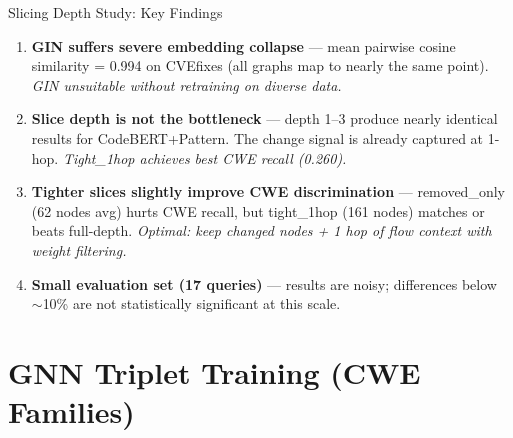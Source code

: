 \documentclass[aspectratio=169,10pt]{beamer}
\begin{document}
\begin{frame}{Slicing Depth Study: Key Findings}
  \begin{enumerate}
    \item[\textcolor{c1}{\faIcon{compress-arrows-alt}}]
      \textbf{GIN suffers severe embedding collapse} — mean pairwise cosine similarity = 0.994
      on CVEfixes (all graphs map to nearly the same point).
      \textit{GIN unsuitable without retraining on diverse data.}

    \vspace{0.3em}
    \item[\textcolor{hit}{\faIcon{chart-bar}}]
      \textbf{Slice depth is not the bottleneck} — depth 1–3 produce nearly identical results
      for CodeBERT+Pattern. The change signal is already captured at 1-hop.
      \textit{Tight\_1hop achieves best CWE recall (0.260).}

    \vspace{0.3em}
    \item[\textcolor{warn}{\faIcon{lightbulb}}]
      \textbf{Tighter slices slightly improve CWE discrimination} — removed\_only (62 nodes avg)
      hurts CWE recall, but tight\_1hop (161 nodes) matches or beats full-depth.
      \textit{Optimal: keep changed nodes + 1 hop of flow context with weight filtering.}

    \vspace{0.3em}
    \item[\textcolor{c3}{\faIcon{bug}}]
      \textbf{Small evaluation set (17 queries)} — results are noisy; differences
      below $\sim$10\% are not statistically significant at this scale.
  \end{enumerate}
\end{frame}


\section{GNN Triplet Training (CWE Families)}
\end{document}
